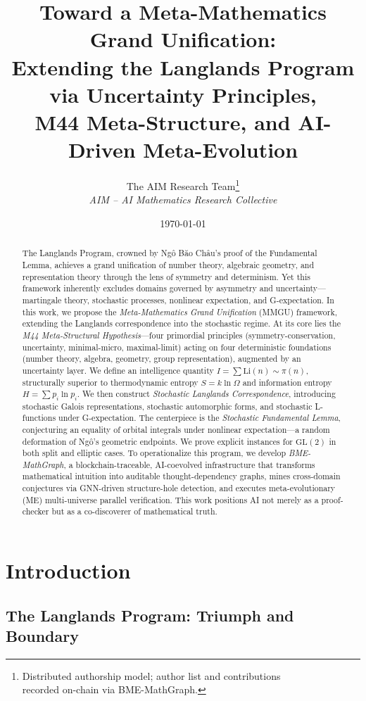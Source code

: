 \documentclass[11pt,a4paper]{article}
\title{Toward a Meta-Mathematics Grand Unification:\\
Extending the Langlands Program via Uncertainty Principles,\\
M44 Meta-Structure, and AI-Driven Meta-Evolution}
\author{The AIM Research Team\thanks{Distributed authorship model; author list and contributions\\
recorded on-chain via BME-MathGraph.}\\
\textit{AIM -- AI Mathematics Research Collective}}
\date{\today}
\theoremstyle{definition}
\newcommand{\GL}{\mathrm{GL}}
\newcommand{\Li}{\mathrm{Li}}
\begin{document}
\maketitle

\begin{abstract}
The Langlands Program, crowned by Ng\^o B\u{a}o Ch\^au's proof of the Fundamental Lemma, achieves a grand unification of number theory, algebraic geometry, and representation theory through the lens of symmetry and determinism. Yet this framework inherently excludes domains governed by asymmetry and uncertainty---martingale theory, stochastic processes, nonlinear expectation, and G-expectation. In this work, we propose the \emph{Meta-Mathematics Grand Unification} (MMGU) framework, extending the Langlands correspondence into the stochastic regime. At its core lies the \emph{M44 Meta-Structural Hypothesis}---four primordial principles (symmetry-conservation, uncertainty, minimal-micro, maximal-limit) acting on four deterministic foundations (number theory, algebra, geometry, group representation), augmented by an uncertainty layer. We define an intelligence quantity $I = \sum \Li(n) \sim \pi(n)$, structurally superior to thermodynamic entropy $S = k\ln\Omega$ and information entropy $H = \sum p_i\ln p_i$. We then construct \emph{Stochastic Langlands Correspondence}, introducing stochastic Galois representations, stochastic automorphic forms, and stochastic L-functions under G-expectation. The centerpiece is the \emph{Stochastic Fundamental Lemma}, conjecturing an equality of orbital integrals under nonlinear expectation---a random deformation of Ng\^o's geometric endpoints. We prove explicit instances for $\GL(2)$ in both split and elliptic cases. To operationalize this program, we develop \emph{BME-MathGraph}, a blockchain-traceable, AI-coevolved infrastructure that transforms mathematical intuition into auditable thought-dependency graphs, mines cross-domain conjectures via GNN-driven structure-hole detection, and executes meta-evolutionary (ME) multi-universe parallel verification. This work positions AI not merely as a proof-checker but as a co-discoverer of mathematical truth.
\end{abstract}

\section{Introduction}\label{sec:intro}

\subsection{The Langlands Program: Triumph and Boundary}
\end{document}
